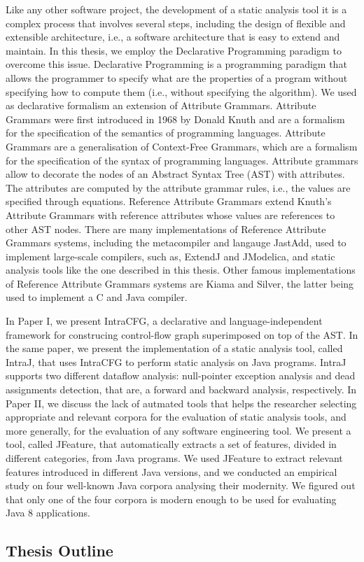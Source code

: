 Like any other software project, the development of a static analysis tool
it is a complex process that involves several steps, including the design of 
flexible and extensible architecture, i.e., a software architecture that is 
easy to extend and maintain. In this thesis, we employ the Declarative Programming
paradigm to overcome this issue. Declarative Programming is a programming 
paradigm that allows the programmer to specify what are the properties of a
program without specifying how to compute them (i.e., without specifying the 
algorithm). We used as declarative formalism an extension of Attribute Grammars. Attribute Grammars
were first introduced in 1968 by Donald Knuth and are a formalism for the specification
of the semantics of programming languages. Attribute Grammars are a generalisation
of Context-Free Grammars, which are a formalism for the specification of the syntax
of programming languages. 
Attribute grammars allow to decorate the nodes of an Abstract Syntax Tree (AST) with attributes. 
The attributes are computed by the attribute grammar rules, i.e., the values are specified
through equations. Reference Attribute Grammars extend Knuth's Attribute Grammars
with reference attributes whose values are references to other AST nodes. 
There are many implementations of Reference Attribute Grammars systems, including
the metacompiler and langauge JastAdd, used to implement large-scale compilers, such as,
ExtendJ and JModelica, and static analysis tools like the one described in this thesis.
Other famous implementations of Reference Attribute Grammars systems are Kiama and Silver, 
the latter being used to implement a C and Java compiler.

In Paper I, we present IntraCFG, a declarative and language-independent framework for 
construcing control-flow graph superimposed on top of the AST. In the same paper, we
present the implementation of a static analysis tool, called IntraJ, that uses IntraCFG
to perform static analysis on Java programs. IntraJ supports two different dataflow analysis:
null-pointer exception analysis and dead assignments detection, that are, a forward and 
backward analysis, respectively. 
In Paper II, we discuss the lack of autmated tools that helps the researcher 
selecting appropriate and relevant corpora for the evaluation of static analysis tools, and more
generally, for the evaluation of any software engineering tool. We present a tool, called
JFeature, that automatically extracts a set of features, divided in different categories,
from Java programs. We used JFeature to extract relevant features introduced in different 
Java versions, and we conducted an empirical study on four well-known Java corpora analysing 
their modernity. We figured out that only one of the four corpora is modern enough to be used
for evaluating Java 8 applications.

 \subsection{Thesis Outline}








